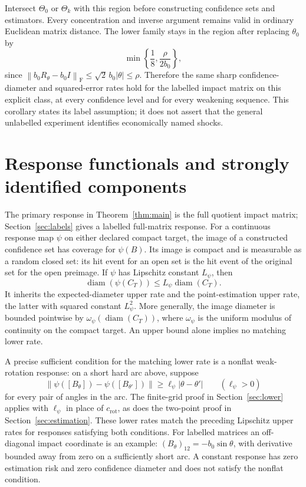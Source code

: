\documentclass[11pt,a4paper]{article}
\numberwithin{equation}{section}
\newcommand{\F}{\mathrm F}
\newcommand{\norm}[1]{\left\lVert #1\right\rVert}
\DeclareMathOperator{\diam}{diam}
\begin{document}
Intersect \(\Theta_0\) or \(\Theta_k\) with this region before constructing
confidence sets and estimators. Every concentration and inverse argument
remains valid in ordinary Euclidean matrix distance.
The lower family stays in the region after replacing \(\theta_0\) by
\[
 \min\left\{\frac18,\frac{\rho}{2b_0}\right\},
\]
since \(\norm{b_0R_\theta-b_0I}_{\F}
\le\sqrt2\,b_0|\theta|\le\rho\).
Therefore the same sharp confidence-diameter and squared-error rates
hold for the labelled impact matrix on this explicit class, at every
confidence level and for every weakening sequence.
This corollary states its label assumption; it does not assert that the
general unlabelled experiment identifies economically named shocks.

\section{Response functionals and strongly identified components}
\label{sec:responses}
The primary response in Theorem~\ref{thm:main} is the full quotient
impact matrix; Section~\ref{sec:labels} gives a labelled full-matrix
response. For a continuous response map \(\psi\) on either declared
compact target, the image of a constructed confidence set has coverage
for \(\psi(B)\). Its image is compact and is measurable as a random
closed set: its hit event for an open set is the hit event of the original
set for the open preimage.
If \(\psi\) has Lipschitz constant \(L_\psi\), then
\[
 \diam(\psi(C_T))\le L_\psi\diam(C_T).
\]
It inherits the expected-diameter upper rate and the point-estimation
upper rate, the latter with squared constant \(L_\psi^2\).
More generally, the image diameter is bounded pointwise by
\(\omega_\psi(\diam(C_T))\), where \(\omega_\psi\) is the uniform modulus
of continuity on the compact target. An upper bound alone implies no
matching lower rate.

A precise sufficient condition for the matching lower rate is a
nonflat weak-rotation response: on a short hard arc above, suppose
\[
 \norm{\psi([B_\theta])-\psi([B_{\theta'}])}
 \ge\ell_\psi|\theta-\theta'|\qquad(\ell_\psi>0)
\]
for every pair of angles in the arc.
The finite-grid proof in Section~\ref{sec:lower} applies with
\(\ell_\psi\) in place of \(c_{\mathrm{rot}}\), as does the two-point
proof in Section~\ref{sec:estimation}.
These lower rates match the preceding Lipschitz upper rates for
responses satisfying both conditions.
For labelled matrices an off-diagonal impact coordinate is an example:
\((B_\theta)_{12}=-b_0\sin\theta\), with derivative bounded away from
zero on a sufficiently short arc.
A constant response has zero estimation risk and zero confidence
diameter and does not satisfy the nonflat condition.
\end{document}

